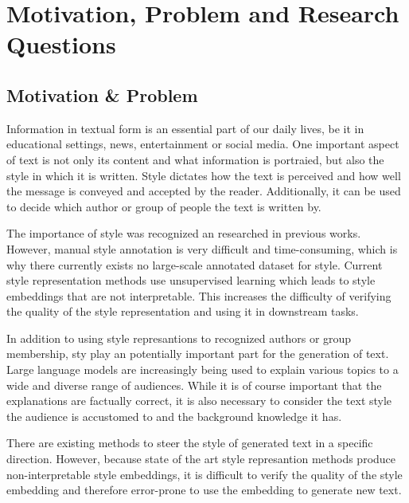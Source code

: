 
\section{Motivation, Problem and Research Questions}

\subsection{Motivation \& Problem}
Information in textual form is an essential part of our daily lives, be it in educational settings, news, entertainment or social media. One important aspect of text is not only its content and what information is portraied, but also the style in which it is written. Style dictates how the text is perceived and how well the message is conveyed and accepted by the reader. Additionally, it can be used to decide which author or group of people the text is written by.

The importance of style was recognized an researched in previous works. %
However, manual style annotation is very difficult and time-consuming, which is why there currently exists no large-scale annotated dataset for style. Current style representation methods use unsupervised learning which leads to style embeddings that are not interpretable. This increases the difficulty of verifying the quality of the style representation and using it in downstream tasks.

In addition to using style represantions to recognized authors or group membership, sty play an potentially important part for the generation of text. Large language models are increasingly being used to explain various topics to a wide and diverse range of audiences. While it is of course important that the explanations are factually correct, it is also necessary to consider the text style the audience is accustomed to and the background knowledge it has.

There are existing methods to steer the style of generated text in a specific direction. %
However, because state of the art style represantion methods produce non-interpretable style embeddings, it is difficult to verify the quality of the style embedding and therefore error-prone to use the embedding to generate new text.


